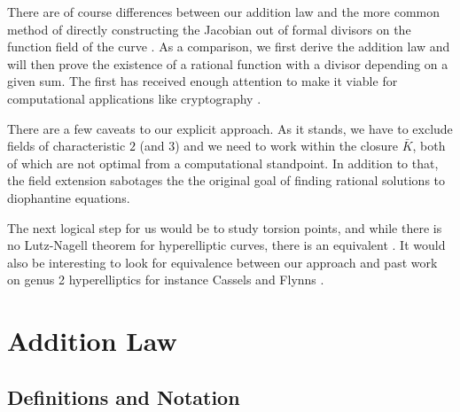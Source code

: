 \documentclass[english,11pt,a4paper]{article}
\begin{document}
There are of course differences between our addition law and the more common method of directly constructing the Jacobian out of formal divisors on the function field of the curve \cite{zucc}. As a comparison, we first derive the addition law and will then prove the existence of a rational function with a divisor depending on a given sum. The first has received enough attention \cite{cantor} to make it viable for computational applications like cryptography \cite{comput}.


There are a few caveats to our explicit approach.
As it stands, we have to exclude fields of characteristic $2$ (and $3$) and we need to work within the closure $\bar K$, both of which are not optimal from a computational standpoint. In addition to that, the field extension sabotages the the original goal of finding rational solutions to diophantine equations.

The next logical step for us would be to study torsion points, and while there is no Lutz-Nagell theorem for hyperelliptic curves, there is an equivalent \cite{grantln}. It would also be interesting to look for equivalence between our approach and past work on genus 2 hyperelliptics for instance Cassels and Flynns \cite{cassels}.

\newpage

\section{Addition Law}\label{ch1}

\subsection{Definitions and Notation}
\end{document}
